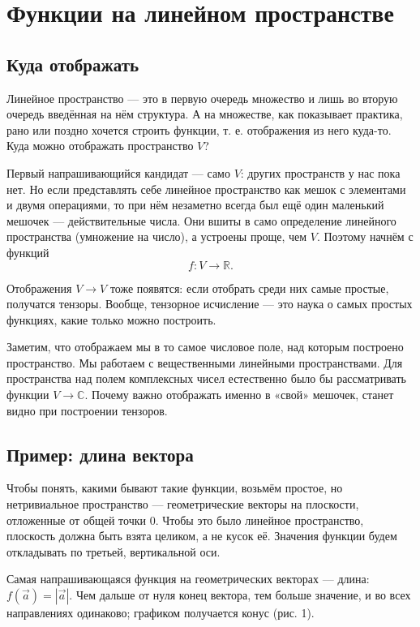 \documentclass[11pt,a4paper]{article}
\begin{document}
\section{Функции на линейном пространстве}

\subsection{Куда отображать}

Линейное пространство — это в первую очередь множество и лишь во вторую очередь введённая на нём структура. А на множестве, как показывает практика, рано или поздно хочется строить функции, т. е. отображения из него куда-то. Куда можно отображать пространство $V$?

Первый напрашивающийся кандидат — само $V$: других пространств у нас пока нет. Но если представлять себе линейное пространство как мешок с элементами и двумя операциями, то при нём незаметно всегда был ещё один маленький мешочек — действительные числа. Они вшиты в само определение линейного пространства (умножение на число), а устроены проще, чем $V$. Поэтому начнём с функций
\[
f\colon V \to \mathbb{R}.
\]

Отображения $V \to V$ тоже появятся: если отобрать среди них самые простые, получатся тензоры. Вообще, тензорное исчисление — это наука о самых простых функциях, какие только можно построить.

Заметим, что отображаем мы в то самое числовое поле, над которым построено пространство. Мы работаем с вещественными линейными пространствами. Для пространства над полем комплексных чисел естественно было бы рассматривать функции $V \to \mathbb{C}$. Почему важно отображать именно в «свой» мешочек, станет видно при построении тензоров.

\subsection{Пример: длина вектора}

Чтобы понять, какими бывают такие функции, возьмём простое, но нетривиальное пространство — геометрические векторы на плоскости, отложенные от общей точки $0$. Чтобы это было линейное пространство, плоскость должна быть взята целиком, а не кусок её. Значения функции будем откладывать по третьей, вертикальной оси.

Самая напрашивающаяся функция на геометрических векторах — длина: $f(\vec a) = |\vec a|$. Чем дальше от нуля конец вектора, тем больше значение, и во всех направлениях одинаково; графиком получается конус (рис. 1).
\end{document}
